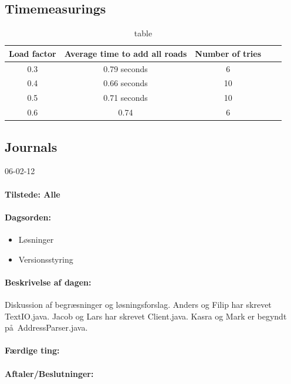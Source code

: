\documentclass[a4paper,10pt,titlepage]{article}
\begin{document}
	\subsection{Timemeasurings}
		\begin{table}[!htb]
		\caption{table}
		\centering
		\begin{tabular}{c c c c c}
Load factor & Average time to add all roads & Number of tries \\ [1.5ex] 
\hline
0.3 & 0.79 seconds & 6\\
0.4 & 0.66 seconds & 10 \\
0.5 & 0.71 seconds & 10 \\
0.6 & 0.74 & 6
\end{tabular}
\end{table}


	\subsection{Journals}		
		\begin{center}
		06-02-12
		\end{center}
				\paragraph{Tilstede: Alle}
				\paragraph{Dagsorden:}
				\begin{itemize}
					\item L\o sninger
					\item Versionsstyring
				\end{itemize}	
			\paragraph{Beskrivelse af dagen:}
			Diskussion af begr\ae sninger og l\o sningsforslag. Anders og Filip har skrevet TextIO.java. Jacob og Lars har skrevet Client.java. Kasra og Mark er begyndt p\aa \ AddressParser.java.
			\paragraph{F\ae rdige ting:}
			
			\paragraph{Aftaler/Beslutninger:}
			
\end{document}
